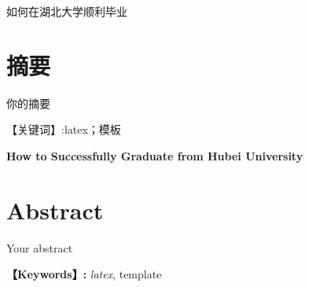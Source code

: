 \documentclass{hbutthesis}
\begin{document}

\newpage %
\thispagestyle{romanfancy}
\begin{center}
  \begin{singlespace}
    \heiti{}如何在湖北大学顺利毕业
  \end{singlespace}
\end{center}

\chapter*{摘\hspace{1em}要}
\vspace{12pt} %

你的摘要
\vspace{12pt}

\heiti{}【关键词】:\songti latex；模板

\newpage
\thispagestyle{romanfancy}
\begin{center}
  \begin{singlespace}
    \textbf{How to Successfully Graduate from Hubei University}
  \end{singlespace}
\end{center}

\chapter*{\textbf{Abstract}}
\vspace{12pt}

Your abstract
\vspace{12pt}

\heiti{}\textbf{【Keywords】:} \textit{latex}, template

{
  \newpage
  \pagestyle{romanfancy}   %
  \begin{center}
    \tableofcontents      %
  \end{center}

  \newpage
  \begin{center}
    \listoffigures        %
  \end{center}

  \newpage
  \begin{center}
    \listoftables         %
  \end{center}
}
\end{document}

